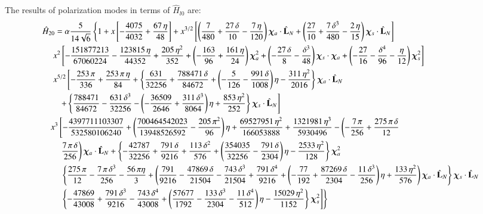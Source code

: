 \documentclass[twocolumn,showpacs,aps,prd,nobibnotes,floatfix]{revtex4-1}
\begin{document}
\begin{widetext}
The results of polarization modes in terms of $\hat{H}_{l0}$ are:
\begin{subequations}
\begin{align}\label{eq:H20}
&\hat{H}_{20} = \alpha \frac{5}{14\sqrt{6}}\left\{ 1 + x\left[-\frac{4075}{4032} + \frac{67 \, \eta}{48}\right]+ x^{3/2}\left[\left(\frac{7}{480} +\frac{27 \, \delta}{10} - \frac{7 \,\eta}{120}\right)\bm{\chi}_a \cdot \hat{\mathbf{L}}_N+\left(\frac{27}{10} +\frac{7 \, \delta^3}{480} - \frac{2 \, \eta}{15}\right)\bm{\chi}_s \cdot \hat{\mathbf{L}}_N\right]\right. \nonumber \\
& \quad \left. x^2\left[-\frac{151877213}{67060224} -\frac{123815 \, \eta}{44352} +\frac{205 \, \eta^2}{352} +\left(-\frac{163}{96} +\frac{161 \, \eta}{24}\right)\bm{\chi}_a^2 + \left(-\frac{27 \, \delta}{8} -\frac{\delta^3}{48}\right)\bm{\chi}_s \cdot \bm{\chi}_a + \left(-\frac{27}{16}-\frac{\delta^4}{96} -\frac{\eta}{12}\right)\bm{\chi}_s^2\right]\right. \nonumber \\
& \quad \left. x^{5/2}\left[-\frac{253 \, \pi}{336}+ \frac{253 \, \pi \, \eta}{84} +\left\{\frac{631}{32256} + \frac{788471\,\delta}{84672} +\left(-\frac{5}{126}-\frac{991\,\delta}{1008}\right)\eta-\frac{311\,\eta^2}{2016}\right\}\bm{\chi}_a \cdot \hat{\mathbf{L}}_N\right.\right. \nonumber\\
& \qquad\left. +\left\{\frac{788471}{84672}-\frac{631\, \delta^3}{32256} -\left(-\frac{36509}{2646} + \frac{311\,\delta^3}{8064}\right)\eta+\frac{853\,\eta^2}{252}\right\}\bm{\chi}_s \cdot \hat{\mathbf{L}}_N\right] \nonumber \\
& \quad  x^3\left[-\frac{4397711103307}{532580106240} + \left( \frac{700464542023}{13948526592} - \frac{205 \, \pi^2}{96}\right)\eta + \frac{69527951 \, \eta^2}{166053888} + \frac{1321981 \, \eta^3}{5930496} -  \left(-\frac{7\,\pi}{256} + \frac{275\,\pi\,\delta}{12} \right.\right. \nonumber \\
& \qquad \left. \frac{7 \, \pi\,\delta}{256}\right)\bm{\chi}_a \cdot \hat{\mathbf{L}}_N + \left\{-\frac{42787}{32256} + \frac{791\,\delta}{9216} +\frac{113\,\delta^2}{576} + \left(\frac{354035}{32256} -\frac{791\,\delta}{2304}\right)\eta - \frac{2533\,\eta^2}{128}\right\}\bm{\chi}_a^2\nonumber\\
&\qquad \left.\left. \left\{\frac{275\,\pi}{12} -\frac{7\,\pi\,\delta^3}{256}-\frac{56\,\pi\eta}{3} + \left(\frac{791}{9216} -\frac{47869\,\delta}{21504}-\frac{743\,\delta^3}{21504} + \frac{791\,\delta^4}{9216} + \left(-\frac{77}{192}+\frac{87269\, \delta}{2304}-\frac{11\, \delta^3}{256}\right)\eta + \frac{133\,\eta^2}{576}\right)\bm{\chi}_a \cdot \hat{\mathbf{L}}_N\right\}\bm{\chi}_s \cdot \hat{\mathbf{L}}_N\right.\right.\nonumber\\
& \qquad \left.\left.\left\{-\frac{47869}{43008} + \frac{791\,\delta^3}{9216} -\frac{743\,\delta^4}{43008} + \left(\frac{57677}{1792} -\frac{133\,\delta^3}{2304} -\frac{11\,\delta^4}{512}\right)\eta - \frac{15029\,\eta^2}{1152}\right\}\bm{\chi}_s^2
\right]\right\}
\end{align}



\end{subequations}
\end{widetext}
\end{document}
